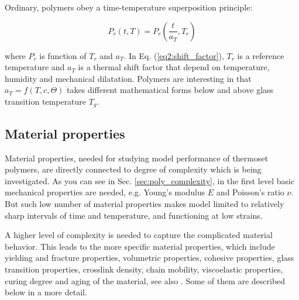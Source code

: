 \begin{itemize}
	Ordinary, polymers obey a time-temperature superposition principle:
	
	\begin{equation}\label{eq2:shift_factor}
		P_{r}(t,T) = P_{r} \left(\dfrac{t}{a_{T}}, T_{r}\right)
	\end{equation}
	
	where $P_{r}$ is function of $T_{r}$ and $a_{T}$. In Eq. (\ref{eq2:shift_factor}), $T_{r}$ is a reference temperature and $a_{T}$ is a thermal shift factor that depend on temperature, humidity and mechanical dilatation. Polymers are interesting in that $a_{T} = f(T, c, \Theta)$ takes different mathematical forms below and above glass transition temperature $T_{g}$.
	
\end{itemize}


\subsection{Material properties}\label{subsec:mat_proper}
\indent

Material properties, needed for studying model performance of thermoset polymers, are directly connected to degree of complexity which is being investigated. As you can see in Sec. \ref{sec:poly_complexity}, in the first level basic mechanical properties are needed, e.g. Young's modulus $E$ and Poisson's ratio $\nu$. But such low number of material properties makes model limited to relatively sharp intervals of time and temperature, and functioning at low strains.

A higher level of complexity is needed to capture the complicated material behavior. This leads to the more specific material properties, which include yielding and fracture properties, volumetric properties, cohesive properties, glass transition properties, crosslink density, chain mobility, viscoelastic properties, curing degree and aging of the material, see also \cite{thermosetting_polymers}. Some of them are described below in a more detail.	

